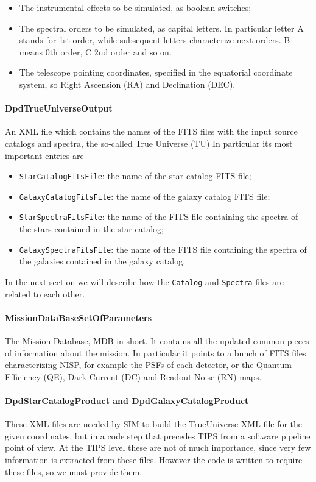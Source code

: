 \begin{itemize}
\item The instrumental effects to be simulated, as boolean switches;
\item The spectral orders to be simulated, as capital letters. In particular letter A stands for 1st order, while subsequent letters characterize next orders. B means 0th order, C 2nd order and so on.
\item The telescope pointing coordinates, specified in the equatorial coordinate system, so Right Ascension (RA) and Declination (DEC).
\end{itemize}

\paragraph{DpdTrueUniverseOutput} 
An XML file which contains the names of the FITS files with the input source catalogs and spectra, the so-called True Universe (TU) In particular its most important entries are

\begin{itemize}
\item \verb+StarCatalogFitsFile+: the name of the star catalog FITS file;
\item \verb+GalaxyCatalogFitsFile+: the name of the galaxy catalog FITS file;
\item \verb+StarSpectraFitsFile+: the name of the FITS file containing the spectra of the stars contained in the star catalog;
\item \verb+GalaxySpectraFitsFile+: the name of the FITS file containing the spectra of the galaxies contained in the galaxy catalog.
\end{itemize}

In the next section we will describe how the \verb+Catalog+ and \verb+Spectra+ files are related to each other.  

\paragraph{MissionDataBaseSetOfParameters} 
The Mission Database, MDB in short. It contains all the updated common pieces of information about the mission. In particular it points to a bunch of FITS files characterizing NISP, for example the PSFs of each detector, or the Quantum Efficiency (QE), Dark Current (DC) and Readout Noise (RN) maps.

\paragraph{DpdStarCatalogProduct and DpdGalaxyCatalogProduct} 
These XML files are needed by SIM to build the TrueUniverse XML file for the given coordinates, but in a code step that precedes TIPS from a software pipeline point of view. At the TIPS level these are not of much importance, since very few information is extracted from these files. However the code is written to require these files, so we must provide them.

